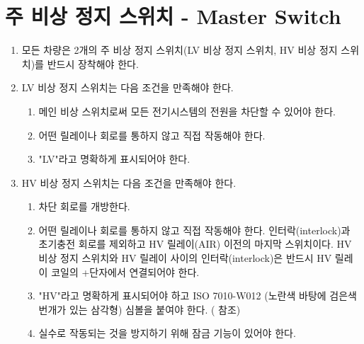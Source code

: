 \documentclass[final,a4paper,10pt]{report}
\begin{document}
\section{주 비상 정지 스위치 - Master Switch}\label{rule:formula-technical.master-switch} \label{section:주 비상 정지 스위치}
\begin{enumerate}
  \item\label{rule:formula-technical.master-switch.lv-and-hv-switches} 모든 차량은 2개의 주 비상 정지 스위치(LV 비상 정지 스위치, HV 비상 정지 스위치)를 반드시 장착해야 한다.

  \item\label{rule:formula-technical.master-switch.lv-switch-conditions} LV 비상 정지 스위치는 다음 조건을 만족해야 한다.
    \begin{enumerate}
      \item\label{rule:formula-technical.master-switch.lv-switch-conditions.cuts-all-electrical-power} 메인 비상 스위치로써 모든 전기시스템의 전원을 차단할 수 있어야 한다.
      \item\label{rule:formula-technical.master-switch.lv-switch-conditions.direct-operation-no-relay} 어떤 릴레이나 회로를 통하지 않고 직접 작동해야 한다.
      \item\label{rule:formula-technical.master-switch.lv-switch-conditions.lv-label} "LV"라고 명확하게 표시되어야 한다.
    \end{enumerate}

  \item\label{rule:formula-technical.master-switch.hv-switch-conditions} HV 비상 정지 스위치는 다음 조건을 만족해야 한다.
    \begin{enumerate}
      \item\label{rule:formula-technical.master-switch.hv-switch-conditions.opens-sdc} 차단 회로를 개방한다.
      \item\label{rule:formula-technical.master-switch.hv-switch-conditions.last-switch-before-air} 어떤 릴레이나 회로를 통하지 않고 직접 작동해야 한다. 인터락(interlock)과 초기충전 회로를 제외하고 HV 릴레이(AIR) 이전의 마지막 스위치이다. HV 비상 정지 스위치와 HV 릴레이 사이의 인터락(interlock)은 반드시 HV 릴레이 코일의 +단자에서 연결되어야 한다.
      \item\label{rule:formula-technical.master-switch.hv-switch-conditions.hv-label-iso7010-symbol} "HV"라고 명확하게 표시되어야 하고 ISO 7010-W012 (노란색 바탕에 검은색 번개가 있는 삼각형) 심볼을 붙여야 한다. ( 참조)
      \item\label{rule:formula-technical.master-switch.hv-switch-conditions.lockable-against-accidental-use} 실수로 작동되는 것을 방지하기 위해 잠금 기능이 있어야 한다.
    \end{enumerate}


\end{enumerate}
\end{document}
